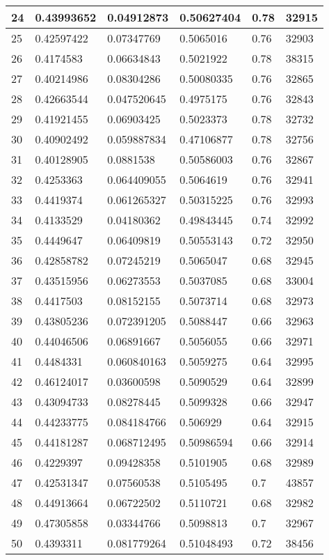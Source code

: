 \begin{longtable}{|l|l|l|l|l|l|}
24 & 0.43993652 & 0.04912873 & 0.50627404 & 0.78 & 32915 \\ \hline 
25 & 0.42597422 & 0.07347769 & 0.5065016 & 0.76 & 32903 \\ \hline 
26 & 0.4174583 & 0.06634843 & 0.5021922 & 0.78 & 38315 \\ \hline 
27 & 0.40214986 & 0.08304286 & 0.50080335 & 0.76 & 32865 \\ \hline 
28 & 0.42663544 & 0.047520645 & 0.4975175 & 0.76 & 32843 \\ \hline 
29 & 0.41921455 & 0.06903425 & 0.5023373 & 0.78 & 32732 \\ \hline 
30 & 0.40902492 & 0.059887834 & 0.47106877 & 0.78 & 32756 \\ \hline 
31 & 0.40128905 & 0.0881538 & 0.50586003 & 0.76 & 32867 \\ \hline 
32 & 0.4253363 & 0.064409055 & 0.5064619 & 0.76 & 32941 \\ \hline 
33 & 0.4419374 & 0.061265327 & 0.50315225 & 0.76 & 32993 \\ \hline 
34 & 0.4133529 & 0.04180362 & 0.49843445 & 0.74 & 32992 \\ \hline 
35 & 0.4449647 & 0.06409819 & 0.50553143 & 0.72 & 32950 \\ \hline 
36 & 0.42858782 & 0.07245219 & 0.5065047 & 0.68 & 32945 \\ \hline 
37 & 0.43515956 & 0.06273553 & 0.5037085 & 0.68 & 33004 \\ \hline 
38 & 0.4417503 & 0.08152155 & 0.5073714 & 0.68 & 32973 \\ \hline 
39 & 0.43805236 & 0.072391205 & 0.5088447 & 0.66 & 32963 \\ \hline 
40 & 0.44046506 & 0.06891667 & 0.5056055 & 0.66 & 32971 \\ \hline 
41 & 0.4484331 & 0.060840163 & 0.5059275 & 0.64 & 32995 \\ \hline 
42 & 0.46124017 & 0.03600598 & 0.5090529 & 0.64 & 32899 \\ \hline 
43 & 0.43094733 & 0.08278445 & 0.5099328 & 0.66 & 32947 \\ \hline 
44 & 0.44233775 & 0.084184766 & 0.506929 & 0.64 & 32915 \\ \hline 
45 & 0.44181287 & 0.068712495 & 0.50986594 & 0.66 & 32914 \\ \hline 
46 & 0.4229397 & 0.09428358 & 0.5101905 & 0.68 & 32989 \\ \hline 
47 & 0.42531347 & 0.07560538 & 0.5105495 & 0.7 & 43857 \\ \hline 
48 & 0.44913664 & 0.06722502 & 0.5110721 & 0.68 & 32982 \\ \hline 
49 & 0.47305858 & 0.03344766 & 0.5098813 & 0.7 & 32967 \\ \hline 
50 & 0.4393311 & 0.081779264 & 0.51048493 & 0.72 & 38456 \\ \hline 
\end{longtable}